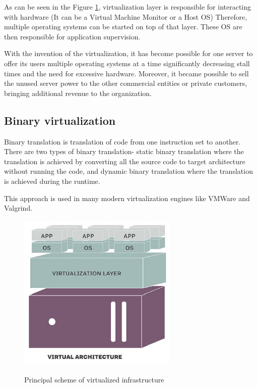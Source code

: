 As can be seen in the Figure \ref{fig:TraditionalAndVirtualInfra1},
virtualization layer is responsible for interacting with hardware
(It can be a Virtual Machine Monitor or a Host OS)
Therefore, multiple operating systems can be started on top of that layer.
These OS are then responsible for application supervision.

With the invention of the virtualization,
it has become possible for one server to
offer its users multiple operating systems at a time
significantly decreasing stall times and the need for excessive hardware.
Moreover, it became possible to sell the unused
server power to the other commercial entities or private customers,
bringing additional revenue to the organization.

\subsection{Binary virtualization}

Binary translation is translation of code from one
instruction set to another. There are two types of binary translation-
static binary translation where the translation is achieved by
converting all the source code to target
architecture without running the code, and
dynamic binary translation where the translation is achieved during the runtime.

This approach is used in many modern
virtualization engines like VMWare and Valgrind\cite{SWVirtPrez}.

\begin{figure}
\includegraphics[height=3in, width=3in]{virtualized}
\caption{Principal scheme of virtualized infrastructure}
\cite{TraditionalAndVirtualInfra1}
\label{fig:TraditionalAndVirtualInfra1}
\end{figure}


